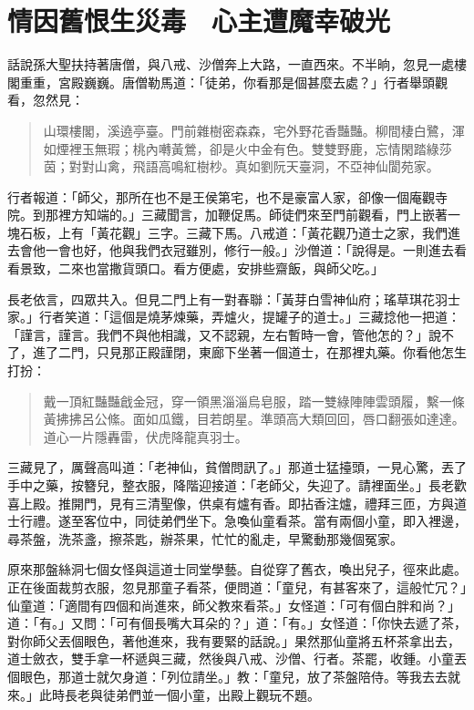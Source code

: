 
\chapter{情因舊恨生災毒　心主遭魔幸破光}

話說孫大聖扶持著唐僧，與八戒、沙僧奔上大路，一直西來。不半晌，忽見一處樓閣重重，宮殿巍巍。唐僧勒馬道：「徒弟，你看那是個甚麼去處？」行者舉頭觀看，忽然見：
\begin{quote}
山環樓閣，溪遶亭臺。門前雜樹密森森，宅外野花香豔豔。柳間棲白鷺，渾如煙裡玉無瑕；桃內囀黃鶯，卻是火中金有色。雙雙野鹿，忘情閑踏綠莎茵；對對山禽，飛語高鳴紅樹杪。真如劉阮天臺洞，不亞神仙閬苑家。
\end{quote}

行者報道：「師父，那所在也不是王侯第宅，也不是豪富人家，卻像一個庵觀寺院。到那裡方知端的。」三藏聞言，加鞭促馬。師徒們來至門前觀看，門上嵌著一塊石板，上有「黃花觀」三字。三藏下馬。八戒道：「黃花觀乃道士之家，我們進去會他一會也好，他與我們衣冠雖別，修行一般。」沙僧道：「說得是。一則進去看看景致，二來也當撒貨頭口。看方便處，安排些齋飯，與師父吃。」

長老依言，四眾共入。但見二門上有一對春聯：「黃芽白雪神仙府；瑤草琪花羽士家。」行者笑道：「這個是燒茅煉藥，弄爐火，提罐子的道士。」三藏捻他一把道：「謹言，謹言。我們不與他相識，又不認親，左右暫時一會，管他怎的？」說不了，進了二門，只見那正殿謹閉，東廊下坐著一個道士，在那裡丸藥。你看他怎生打扮：
\begin{quote}
戴一頂紅豔豔戧金冠，穿一領黑淄淄烏皂服，踏一雙綠陣陣雲頭履，繫一條黃拂拂呂公絛。面如瓜鐵，目若朗星。準頭高大類回回，唇口翻張如達達。道心一片隱轟雷，伏虎降龍真羽士。
\end{quote}

三藏見了，厲聲高叫道：「老神仙，貧僧問訊了。」那道士猛擡頭，一見心驚，丟了手中之藥，按簪兒，整衣服，降階迎接道：「老師父，失迎了。請裡面坐。」長老歡喜上殿。推開門，見有三清聖像，供桌有爐有香。即拈香注爐，禮拜三匝，方與道士行禮。遂至客位中，同徒弟們坐下。急喚仙童看茶。當有兩個小童，即入裡邊，尋茶盤，洗茶盞，擦茶匙，辦茶果，忙忙的亂走，早驚動那幾個冤家。

原來那盤絲洞七個女怪與這道士同堂學藝。自從穿了舊衣，喚出兒子，徑來此處。正在後面裁剪衣服，忽見那童子看茶，便問道：「童兒，有甚客來了，這般忙冗？」仙童道：「適間有四個和尚進來，師父教來看茶。」女怪道：「可有個白胖和尚？」道：「有。」又問：「可有個長嘴大耳朵的？」道：「有。」女怪道：「你快去遞了茶，對你師父丟個眼色，著他進來，我有要緊的話說。」果然那仙童將五杯茶拿出去，道士斂衣，雙手拿一杯遞與三藏，然後與八戒、沙僧、行者。茶罷，收鍾。小童丟個眼色，那道士就欠身道：「列位請坐。」教：「童兒，放了茶盤陪侍。等我去去就來。」此時長老與徒弟們並一個小童，出殿上觀玩不題。

